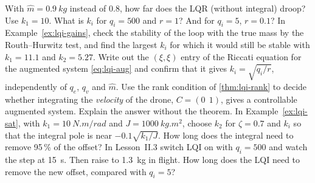 \begin{exercises}
\exercise[1] With $\hat m = \SI{0.9}{kg}$ instead of 0.8, how far does the LQR (without integral) droop? Use $k_1 = 10$.
\exercise[1] What is $k_i$ for $q_i = 500$ and $r = 1$? And for $q_i = 5$, $r = 0.1$?
\exercise[1] In Example~\ref{ex:lqi-gains}, check the stability of the loop with the true mass by the Routh–Hurwitz test, and find the largest $k_i$ for which it would still be stable with $k_1 = 11.1$ and $k_2 = 5.27$.
\exercise[2] Write out the $(\xi, \xi)$ entry of the Riccati equation for the augmented system \eqref{eq:lqi-aug} and confirm that it gives $k_i = \sqrt{q_i/r}$, independently of $q_e$, $q_v$ and $\hat m$.
\exercise[2] Use the rank condition of \cref{thm:lqi-rank} to decide whether integrating the \emph{velocity} of the drone, $C = (0\ \ 1)$, gives a controllable augmented system. Explain the answer without the theorem.
\exercise[2] In Example~\ref{ex:lqi-sat}, with $k_1 = \SI{10}{N.m/rad}$ and $J = \SI{1000}{kg.m^2}$, choose $k_2$ for $\zeta = 0.7$ and $k_i$ so that the integral pole is near $-0.1\sqrt{k_1/J}$. How long does the integral need to remove 95\,\% of the offset?
\exercise[2] In Lesson~II.3 switch LQI on with $q_i = 500$ and watch the step at \SI{15}{s}. Then raise  to \SI{1.3}{kg} in flight. How long does the LQI need to remove the new offset, compared with $q_i = 5$?

\end{exercises}

